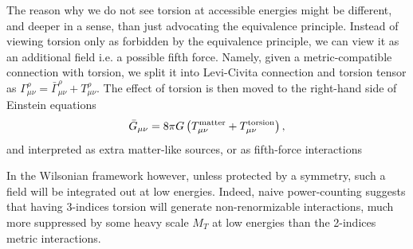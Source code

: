 \documentclass[../geometry_main.tex]{subfiles}
\begin{document}
\begin{mytheorem}
The reason why we do not see torsion at accessible energies might be different, and deeper in a sense, than just advocating the equivalence principle. 
Instead of viewing torsion only as forbidden by the equivalence principle, we can view it as an additional field i.e. a possible fifth force.
Namely, given a metric-compatible connection with torsion, we split it into Levi-Civita connection and torsion tensor as $\Gamma^\rho_{\mu\nu} = \bar{\Gamma}^{\rho}_{\mu\nu} + T^{\rho}_{\mu\nu}$.
The effect of torsion is then moved to the right-hand side of Einstein equations
\begin{equation}
    \bar{G}_{\mu\nu}=8\pi G \left(T_{\mu\nu}^{\rm matter} + T_{\mu\nu}^{\rm torsion}\right),
\end{equation}
and interpreted as extra matter-like sources, or as fifth-force interactions

In the Wilsonian framework however, unless protected by a symmetry, such a field will be integrated out at low energies.
Indeed, naive power-counting suggests that having 3-indices torsion will generate non-renormizable interactions, much more suppressed by some heavy scale \(M_T\) at low energies than the 2-indices metric interactions.
\end{mytheorem}
\end{document}
